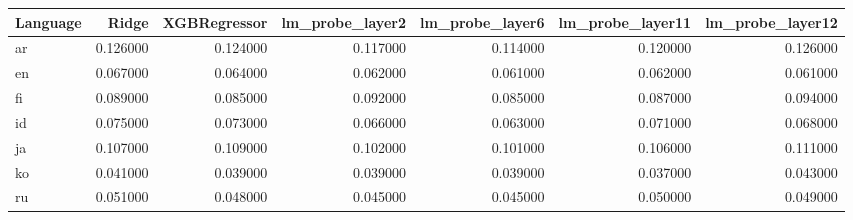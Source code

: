 \begin{tabular}{lrrrrrr}
\toprule
Language & Ridge & XGBRegressor & lm_probe_layer2 & lm_probe_layer6 & lm_probe_layer11 & lm_probe_layer12 \\
\midrule
ar & 0.126000 & 0.124000 & 0.117000 & 0.114000 & 0.120000 & 0.126000 \\
en & 0.067000 & 0.064000 & 0.062000 & 0.061000 & 0.062000 & 0.061000 \\
fi & 0.089000 & 0.085000 & 0.092000 & 0.085000 & 0.087000 & 0.094000 \\
id & 0.075000 & 0.073000 & 0.066000 & 0.063000 & 0.071000 & 0.068000 \\
ja & 0.107000 & 0.109000 & 0.102000 & 0.101000 & 0.106000 & 0.111000 \\
ko & 0.041000 & 0.039000 & 0.039000 & 0.039000 & 0.037000 & 0.043000 \\
ru & 0.051000 & 0.048000 & 0.045000 & 0.045000 & 0.050000 & 0.049000 \\
\bottomrule
\end{tabular}
